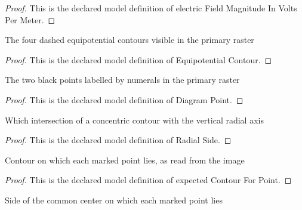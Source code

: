 \begin{proof}
  This is the declared model definition of electric Field Magnitude In Volts Per Meter.
\end{proof}
\begin{definition}
  \label{def:physics:phyx-mini-0876:phyxminiproblems-problemphyxmini0876-equipotentialcontour}
  The four dashed equipotential contours visible in the primary raster
\end{definition}
\begin{proof}
  This is the declared model definition of Equipotential Contour.
\end{proof}
\begin{definition}
  \label{def:physics:phyx-mini-0876:phyxminiproblems-problemphyxmini0876-diagrampoint}
  The two black points labelled by numerals in the primary raster
\end{definition}
\begin{proof}
  This is the declared model definition of Diagram Point.
\end{proof}
\begin{definition}
  \label{def:physics:phyx-mini-0876:phyxminiproblems-problemphyxmini0876-radialside}
  Which intersection of a concentric contour with the vertical radial axis
\end{definition}
\begin{proof}
  This is the declared model definition of Radial Side.
\end{proof}
\begin{definition}
  \label{def:physics:phyx-mini-0876:phyxminiproblems-problemphyxmini0876-expectedcontourforpoint}
  Contour on which each marked point lies, as read from the image
\end{definition}
\begin{proof}
  This is the declared model definition of expected Contour For Point.
\end{proof}
\begin{definition}
  \label{def:physics:phyx-mini-0876:phyxminiproblems-problemphyxmini0876-expectedsideforpoint}
  Side of the common center on which each marked point lies
\end{definition}
